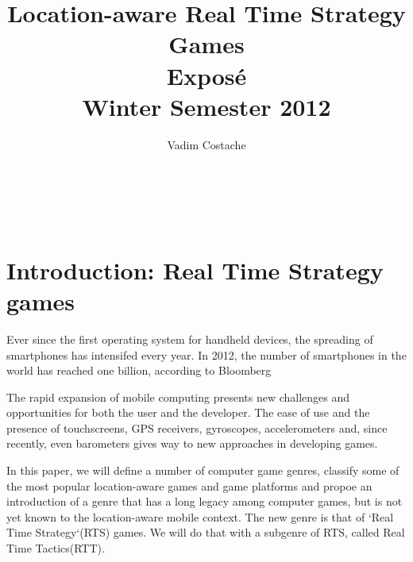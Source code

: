 \documentclass{article}
\title{Location-aware Real Time Strategy Games \\ Expos\'e \\
Winter Semester 2012}
\author{Vadim Costache} %
\begin{document}
\maketitle %

\setlength\parindent{0pt} %

\renewcommand{\labelenumi}{\alph{enumi}.} %

\newcommand{\superscript}[1]{\ensuremath{^{\textrm{#1}}}}
\newcommand{\subscript}[1]{\ensuremath{_{\textrm{#1}}}}

   
\begin{verbatim}



\end{verbatim}
     
\tableofcontents

\newpage


\section{Introduction: Real Time Strategy games}

Ever since the first operating system for handheld devices, the spreading of
smartphones has intensifed every year. In 2012, the number of smartphones in
the world has reached one billion, according to Bloomberg\newline

The rapid expansion of mobile computing presents new challenges and
opportunities for both the user and the developer. The ease of use and the
presence of touchscreens, GPS receivers, gyroscopes, accelerometers and, since
recently, even barometers gives way to new approaches in developing
games.\newline

In this paper, we will define a number of computer game genres, classify some of
the most popular location-aware games and game platforms and propoe an
introduction of a genre that has a long legacy among computer games, but is
not yet known to the location-aware mobile context. The new genre is that of
`Real Time Strategy`(RTS) games. We will do that with a subgenre of RTS, called
Real Time Tactics(RTT).\newline
\end{document}

